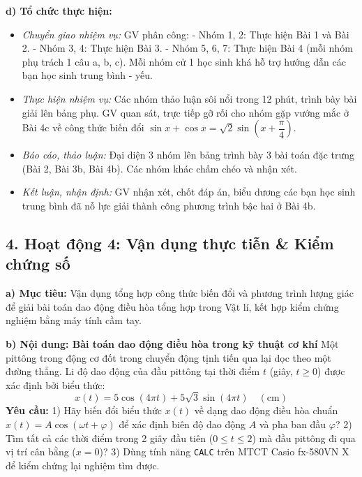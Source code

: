 \documentclass[12pt, a4paper]{article}
\begin{document}
\noindent \textbf{d) Tổ chức thực hiện:}  
\begin{itemize}[leftmargin=0.8cm]  
    \item \textit{Chuyển giao nhiệm vụ:} GV phân công:  
    - Nhóm 1, 2: Thực hiện Bài 1 và Bài 2.  
    - Nhóm 3, 4: Thực hiện Bài 3.  
    - Nhóm 5, 6, 7: Thực hiện Bài 4 (mỗi nhóm phụ trách 1 câu a, b, c).  
    Mỗi nhóm cử 1 học sinh khá hỗ trợ hướng dẫn các bạn học sinh trung bình - yếu.  
    \item \textit{Thực hiện nhiệm vụ:} Các nhóm thảo luận sôi nổi trong 12 phút, trình bày bài giải lên bảng phụ. GV quan sát, trực tiếp gỡ rối cho nhóm gặp vướng mắc ở Bài 4c về công thức biến đổi $\sin x + \cos x = \sqrt{2}\sin\left(x + \dfrac{\pi}{4}\right)$.  
    \item \textit{Báo cáo, thảo luận:} Đại diện 3 nhóm lên bảng trình bày 3 bài toán đặc trưng (Bài 2, Bài 3b, Bài 4b). Các nhóm khác chấm chéo và nhận xét.  
    \item \textit{Kết luận, nhận định:} GV nhận xét, chốt đáp án, biểu dương các bạn học sinh trung bình đã nỗ lực giải thành công phương trình bậc hai ở Bài 4b.  
\end{itemize}  
  
\subsection*{4. Hoạt động 4: Vận dụng thực tiễn \& Kiểm chứng số}  
  
\noindent \textbf{a) Mục tiêu:}  
Vận dụng tổng hợp công thức biến đổi và phương trình lượng giác để giải bài toán dao động điều hòa tổng hợp trong Vật lí, kết hợp kiểm chứng nghiệm bằng máy tính cầm tay.  
  
\noindent \textbf{b) Nội dung: Bài toán dao động điều hòa trong kỹ thuật cơ khí}  
Một pittông trong động cơ đốt trong chuyển động tịnh tiến qua lại dọc theo một đường thẳng. Li độ dao động của đầu pittông tại thời điểm $t$ (giây, $t \ge 0$) được xác định bởi biểu thức:  
$$x(t) = 5\cos(4\pi t) + 5\sqrt{3}\sin(4\pi t) \quad (\text{cm})$$  
\textbf{Yêu cầu:}  
1) Hãy biến đổi biểu thức $x(t)$ về dạng dao động điều hòa chuẩn $x(t) = A\cos(\omega t + \varphi)$ để xác định biên độ dao động $A$ và pha ban đầu $\varphi$?  
2) Tìm tất cả các thời điểm trong 2 giây đầu tiên ($0 \le t \le 2$) mà đầu pittông đi qua vị trí cân bằng ($x = 0$)?  
3) Dùng tính năng \texttt{CALC} trên MTCT Casio fx-580VN X để kiểm chứng lại nghiệm tìm được.  
  
\end{document}
